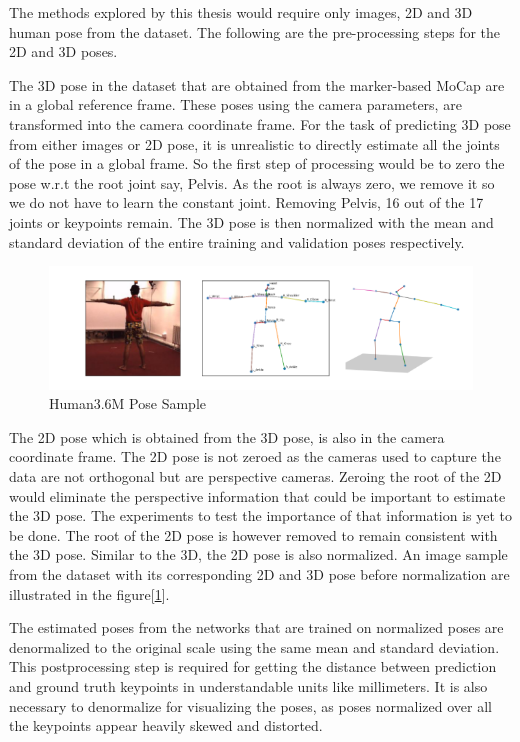 The methods explored by this thesis would require only images, 2D and 3D human pose from the dataset. The following are the pre-processing steps for the 2D and 3D poses.

The 3D pose in the dataset that are obtained from the marker-based \ac{MoCap} are in a global reference frame. These poses using the camera parameters, are transformed into the camera coordinate frame. For the task of predicting 3D pose from either images or 2D pose, it is unrealistic to directly estimate all the joints of the pose in a global frame. So the first step of processing would be to zero the pose w.r.t the root joint say, Pelvis. As the root is always zero, we remove it so we do not have to learn the constant joint. Removing Pelvis, 16 out of the 17 joints or keypoints remain. The 3D pose is then normalized with the mean and standard deviation of the entire training and validation poses respectively. 


\begin{figure}[h]
    \centering
    \includegraphics[width=\textwidth]{figures/h36poses.png}
    \caption{Human3.6M Pose Sample}
    \label{fig:h36_poses}
\end{figure}

The 2D pose which is obtained from the 3D pose, is also in the camera coordinate frame. The 2D pose is not zeroed as the cameras used to capture the data are not orthogonal but are perspective cameras. Zeroing the root of the 2D would eliminate the perspective information that could be important to estimate the 3D pose. The experiments to test the importance of that information is yet to be done. The root of the 2D pose is however removed to remain consistent with the 3D pose. Similar to the 3D, the 2D pose is also normalized. An image sample from the dataset with its corresponding 2D and 3D pose before normalization are illustrated in the figure[\ref{fig:h36_poses}].


The estimated poses from the networks that are trained on normalized poses are denormalized to the original scale using the same mean and standard deviation. This postprocessing step is required for getting the distance between prediction and ground truth keypoints in understandable units like millimeters. It is also necessary to denormalize for visualizing the poses, as poses normalized over all the keypoints appear heavily skewed and distorted. 




